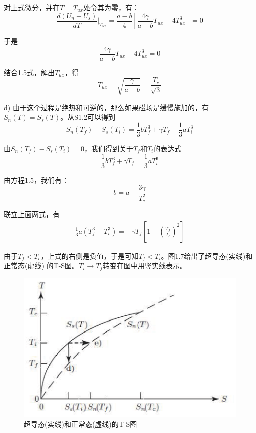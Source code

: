对上式微分，并在$T=T_{ux}$处令其为零，有：
\begin{equation*}
\frac{d(U_n-U_s)}{dT}|_{T_{ux}}=\frac{a-b}{4} \left[\frac{4\gamma}{a-b}T_{ux}-4T_{ux}^3\right]=0 \tag{S1.15}
\end{equation*}

于是
\begin{equation*}
\frac{4\gamma}{a-b}T_{ux}-4T_{ux}^3=0 \tag{S1.16}
\end{equation*}

结合1.5式，解出$T_{ux}$，得
\begin{equation*}
T_{ux}=\sqrt{\frac{\gamma}{a-b}}=\frac{T_c}{\sqrt{3}} \tag{1.9}
\end{equation*}

d) 由于这个过程是绝热和可逆的，那么如果磁场是缓慢施加的，有$S_n(T)=S_s(T)$。从S1.2可以得到
\begin{equation*}
S_n(T_f ) − S_s(T_i) =\frac{1}{3}bT_f^3 +\gamma T_f −\frac{1}{3}aT_i^3 \tag{S1.17}
\end{equation*}

由$S_n(T_f )−S_s(T_i)=0$，我们得到关于$T_f$和$T_i$的表达式
\begin{equation*}
\frac{1}{3}bT_f^3 +\gamma T_f =\frac{1}{3}aT_i^3 \tag{S1.18}
\end{equation*}

由方程1.5，我们有：
\begin{equation*}
b = a − \frac{3\gamma}{T_c^2} \tag{S1.19}
\end{equation*}

联立上面两式，有
\begin{align*}
\frac{1}{3}a(T_f^3-T_i^3)=-\gamma T_f\left[ 1-\left(\frac{T_f}{T_c}\right)^2\right]\tag{S1.20}
\end{align*}

由于$T_f<T_c$，上式的右侧是负值，于是可知$T_f<T_i$。图1.7给出了超导态(实线)和正常态(虚线)
的T-S图。$T_i\rightarrow T_f$转变在图中用竖实线表示。

\begin{figure}
  \centering
 \includegraphics[scale=0.7]{chpt1/figs/fig1.7.eps}
  \caption{超导态(实线)和正常态(虚线)的T-S图}\label{fig:tsplot}
\end{figure}


